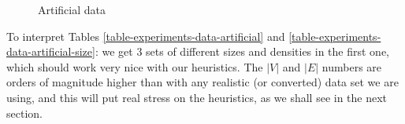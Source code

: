 \begin{figure}
  \caption{Artificial data}
  \label{image-experiments-data-artificial}
  \centering
\end{figure}

To interpret Tables \ref{table-experiments-data-artificial} and \ref{table-experiments-data-artificial-size}: we get 3 sets of different sizes and densities in the first one, which should work very nice with our heuristics. The $|V|$ and $|E|$ numbers are orders of magnitude higher than with any realistic (or converted) data set we are using, and this will put real stress on the heuristics, as we shall see in the next section.

